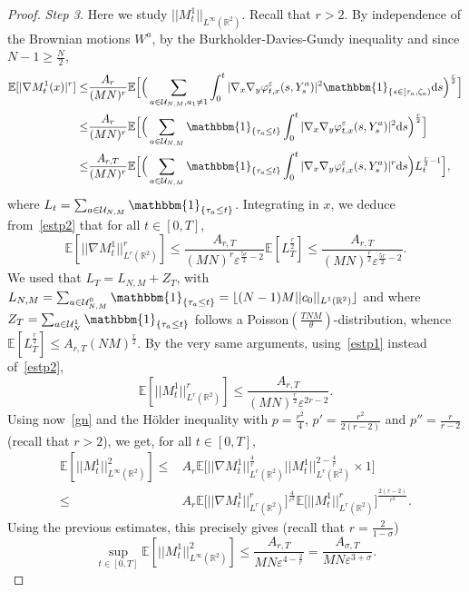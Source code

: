 \documentclass[11pt]{article}
\newcommand{\E}{\mathbb{E}}
\newcommand{\R}{\mathbb{R}}
\newcommand{\1}{\mathbbm{1}}
\newcommand{\dd}{{\rm d}}
\newcommand{\Uu}{\mathcal U}
\newcommand{\e}{\varepsilon}
\begin{document}
\begin{proof}
{\it Step 3.} Here we study $||M^1_t||_{L^\infty(\R^2)}$.
Recall that $r>2$. By independence of the Brownian motions $W^a$, by the 
Burkholder-Davies-Gundy inequality and since $N-1\geq \frac N2$,
\begin{align*}
\E[|\nabla M^1_t(x)|^r] \leq& \frac{A_r}{(MN)^r}\E\Big[\Big(\sum_{a \in \Uu_{N,M},a_1\neq 1}\int_0^t
|\nabla_x\nabla_y\varphi^\e_{t,x}(s,Y^{a}_s)|^2\1_{\{s \in [\tau_a,\zeta_a)} \dd s\Big)^{\frac r2}\Big]\\
 \leq& \frac{A_r}{(MN)^r}\E\Big[\Big(\sum_{a \in \Uu_{N,M}}\1_{\{\tau_a\leq t\}} \int_0^t 
|\nabla_x\nabla_y\varphi^\e_{t,x}(s,Y^{a}_s)|^2\dd s\Big)^{\frac r2}\Big]\\
\leq & \frac{A_{r,T}}{(MN)^r}\E\Big[\Big(\sum_{a \in \Uu_{N,M}} \1_{\{\tau_a\leq t\}}\int_0^t
|\nabla_x\nabla_y\varphi^\e_{t,x}(s,Y^{a}_s)|^r \dd s\Big) L_t^{\frac r2-1}\Big],
\end{align*}
where $L_t=\sum_{a \in \Uu_{N,M}}\1_{\{\tau_a \leq t\}}$.
Integrating in $x$, we deduce from~\eqref{estp2} that for all $t\in [0,T]$,
$$
\E[||\nabla M^1_t||_{L^r(\R^2)}^r]\leq \frac{A_{r,T}}{(MN)^r\e^{\frac{5r}2-2}}\E[L_T^{\frac r2}]
\leq \frac{A_{r,T}}{(MN)^{\frac r 2}\e^{\frac{5r}2-2}}.
$$
We used that $L_T=L_{N,M}+Z_T$, with $L_{N,M}=\sum_{a \in \Uu_{N,M}^0}\1_{\{\tau_a \leq t\}}=
\lfloor (N-1)M||c_0||_{L^1(\R^2)}\rfloor$ and where 
$Z_T=\sum_{a \in \Uu_{N}^1}\1_{\{\tau_a \leq t\}}$ follows 
a Poisson$(\frac{TNM}\theta)$-distribution, whence  $\E[L_T^{\frac r 2}]\leq A_{r,T} (NM)^{\frac r2}$.
By the very same arguments, using~\eqref{estp1} instead of~\eqref{estp2},
$$
\E[||M^1_t||_{L^r(\R^2)}^r] \leq \frac{A_{r,T}}{(MN)^{\frac r 2}\e^{2r-2}}.
$$
Using now~\eqref{gn} and the Hölder inequality with $p=\frac {r^2}{4}$, $p'=\frac {r^2}{2(r-2)}$ and 
$p''=\frac {r}{r-2}$ (recall that $r>2$), we get, for all $t\in [0,T]$,
\begin{align*}
\E[||M^1_t||_{L^\infty(\R^2)}^2]\leq& A_r\E\Big[||\nabla M^1_t||_{L^r(\R^2)}^{\frac{4}r}
||M^1_t||_{L^r(\R^2)}^{2-\frac{4}r} \times 1\Big]\\
\leq& A_r \E\Big[||\nabla M^1_t||_{L^r(\R^2)}^r\Big]^{\frac{4}{r^2}}
\E\Big[||M^1_t||_{L^r(\R^2)}^r\Big]^{\frac{2(r-2)}{r^2}}.
\end{align*}
Using the previous estimates, this precisely gives (recall that $r=\frac2{1-\sigma}$)
\begin{equation*}
\sup_{t \in [0,T]}\E[||M^1_t||_{L^\infty(\R^2)}^2]\leq \frac{A_{r,T}}{MN\e^{4-\frac 2 r}}
=\frac{A_{\sigma,T}}{MN\e^{3+\sigma}}.
\end{equation*}


\end{proof}
\end{document}
